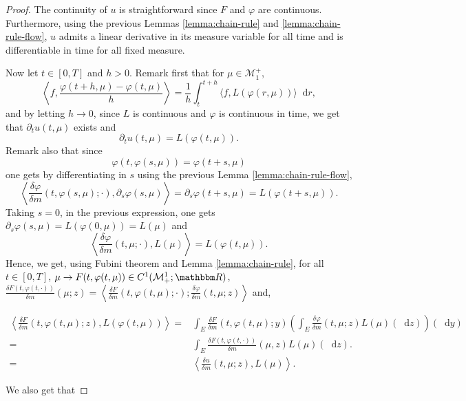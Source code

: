 \documentclass[a4paper,11pt, reqno]{amsart}
\newcommand{\cM}{\mathcal{M}}	\newcommand{\MM}{\mathbbm{M}}
\newcommand{\dd}{\mathop{}\!\mathrm{d}}
\newcommand{\1}{\mathbbm{1}}
\theoremstyle{plain}
\theoremstyle{definition}
\begin{document}
\begin{proof}
  The continuity of $u$ is straightforward since $F$ and $\varphi$ are
  continuous. Furthermore, using the previous Lemmas \ref{lemma:chain-rule}
  and \ref{lemma:chain-rule-flow}, $u$ admits a linear derivative in its
  measure variable for all time and is differentiable in time for all fixed
  measure.
  
  Now let $t \in [0, T]$ and $h > 0$. Remark first that for $\mu \in
  \cM_1^+$,
  \[ \left\langle f, \frac{\varphi (t + h, \mu) - \varphi (t, \mu)}{h}
     \right\rangle = \frac{1}{h} \int_t^{t + h} \langle f, L (\varphi (r,
     \mu)) \rangle \dd r, \]
  and by letting $h \rightarrow 0$, since $L$ is continuous and $\varphi$ is
  continuous in time, we get that $\partial_t u (t, \mu)$ exists and
  \[ \partial_t u (t, \mu) = L (\varphi (t, \mu)) . \]
  Remark also that since
  \[ \varphi (t, \varphi (s, \mu)) = \varphi (t + s, \mu) \]
  one gets by differentiating in $s$ using the previous Lemma
  \ref{lemma:chain-rule-flow},
  \[ \left\langle \frac{\delta \varphi}{\delta m} (t, \varphi (s, \mu) ;
     \cdot), \partial_s \varphi (s, \mu) \right\rangle = \partial_s \varphi
     (t + s, \mu) = L (\varphi (t + s, \mu)) . \]
  Taking $s = 0$, in the previous expression, one gets $\partial_s \varphi (s,
  \mu) = L (\varphi (0, \mu)) = L (\mu)$ and
  \[ \left\langle \frac{\delta \varphi}{\delta m} (t, \mu ; \cdot), L (\mu)
     \right\rangle = L (\varphi (t, \mu)) . \]
  Hence, we get, using Fubini theorem and Lemma \ref{lemma:chain-rule},
  for all $t \in [0, T]$, $\mu \rightarrow F (t, \varphi (t, \mu)) \in C^1
  (\cM_+^1 ; \RR)$, $\frac{\delta F (t, \varphi (t,
  \cdot))}{\delta m} (\mu ; z) = \left\langle \frac{\delta F}{\delta m} (t,
  \varphi (t, \mu) ; \cdot) ; \frac{\delta \varphi}{\delta m} (t, \mu ; z)
  \right\rangle$ and,
  
  \begin{align*}
    \left\langle \frac{\delta F}{\delta m} (t, \varphi (t, \mu) ; z), L
    (\varphi (t, \mu)) \right\rangle = & \int_E \frac{\delta F}{\delta m} (t,
    \varphi (t, \mu) ; y) \left( \int_E \frac{\delta \varphi}{\delta m} (t,
    \mu ; z) L (\mu) (\dd z) \right) (\dd y)\\
    = & \int_E \frac{\delta F (t, \varphi (t, \cdot))}{\delta m} (\mu, z) L
    (\mu) (\dd z) .\\
    = & \left\langle \frac{\delta u}{\delta m} (t, \mu ; z), L (\mu)
    \right\rangle .
  \end{align*}
  
  We also get that
  

\end{proof}
\end{document}
